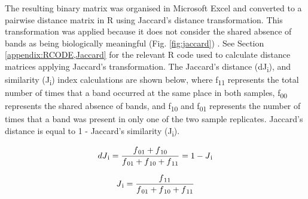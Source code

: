\noindent The resulting binary matrix was organised in Microsoft Excel\textsuperscript{\textregistered} and converted to a pairwise distance matrix in R using Jaccard's distance transformation. This transformation was applied because it does not consider the shared absence of bands as being biologically meaningful (Fig. \ref{fig:jaccard}) \citep{jacc}. See Section \ref{appendix:RCODE,Jaccard} for the relevant R code used to calculate distance matrices applying Jaccard's transformation. The Jaccard's distance (dJ\textsubscript{i}), and similarity (J\textsubscript{i}) index calculations are shown below, where f\textsubscript{11} represents the total number of times that a band occurred at the same place in both samples, f\textsubscript{00} represents the shared absence of bands, and f\textsubscript{10} and f\textsubscript{01} represents the number of times that a band was present in only one of the two sample replicates. Jaccard's distance is equal to 1 - Jaccard's similarity (J\textsubscript{i}). 
\vspace{0.4cm}

\[dJ\textsubscript{i} = \frac{f\textsubscript{01} + f\textsubscript{10}}{f\textsubscript{01} + f\textsubscript{10} + f\textsubscript{11}} = 1 - J\textsubscript{i} \] 

\[J\textsubscript{i} = \frac{f\textsubscript{11}}{f\textsubscript{01} + f\textsubscript{10} + f\textsubscript{11}} \] 

